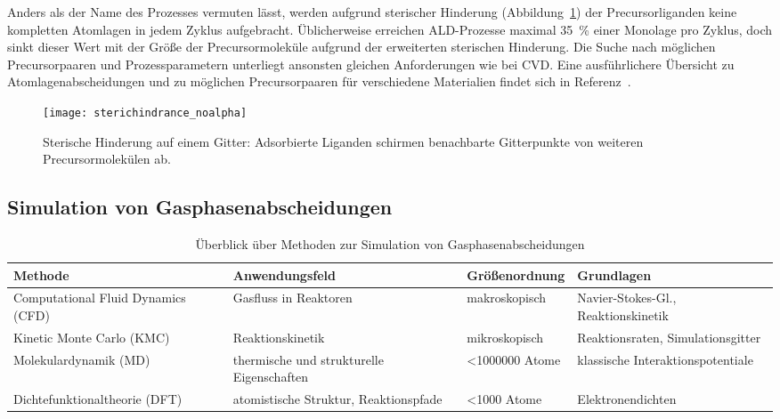 Anders als der Name des Prozesses vermuten lässt, werden aufgrund sterischer Hinderung (Abbildung~\ref{fig:sterichindrance}) der Precursorliganden keine kompletten Atomlagen in jedem Zyklus aufgebracht.
Üblicherweise erreichen ALD-Prozesse maximal \SI{35}{\percent} einer Monolage pro Zyklus\cite{ylilammi_monolayer_1996}, doch sinkt dieser Wert mit der Größe der Precursormoleküle aufgrund der erweiterten sterischen Hinderung.
Die Suche nach möglichen Precursorpaaren und Prozessparametern unterliegt ansonsten gleichen Anforderungen wie bei CVD.
Eine ausführlichere Übersicht zu Atomlagenabscheidungen und zu möglichen Precursorpaaren für verschiedene Materialien findet sich in Referenz~\cite{puurunen_surface_2005}.

\begin{figure}
  \centering
  \texttt{[image: sterichindrance\_noalpha]}
  \caption[Sterische Hinderung auf einem Gitter]{
    Sterische Hinderung auf einem Gitter:
    Adsorbierte Liganden schirmen benachbarte Gitterpunkte von weiteren Precursormolekülen ab.
  }
  \label{fig:sterichindrance}
\end{figure}

\subsection{Simulation von Gasphasenabscheidungen}

\begin{table}
  \oddrowcolors
  \caption{Überblick über Methoden zur Simulation von Gasphasenabscheidungen}
  \label{tab:deposition-simulations}
  \begin{tabularx}{\textwidth}{|XXlX|}
    \hline
    \textbf{Methode}                   & \textbf{Anwendungsfeld}                   & \textbf{Größenordnung} & \textbf{Grundlagen}                 \\
    \hline
    Computational Fluid Dynamics (CFD) & Gasfluss in Reaktoren                     & makroskopisch          & Navier-Stokes-Gl., Reaktionskinetik \\
    Kinetic Monte Carlo (KMC)          & Reaktionskinetik                          & mikroskopisch          & Reaktionsraten, Simulationsgitter   \\
    Molekular\-dynamik (MD)            & thermische und strukturelle Eigenschaften & \num{<1000000} Atome   & klassische Interaktionspotentiale   \\
    Dichte\-funktional\-theorie (DFT)  & atomistische Struktur, Reaktionspfade     & \num{<1000} Atome      & Elektronendichten                   \\
    \hline
  \end{tabularx}
\end{table}

